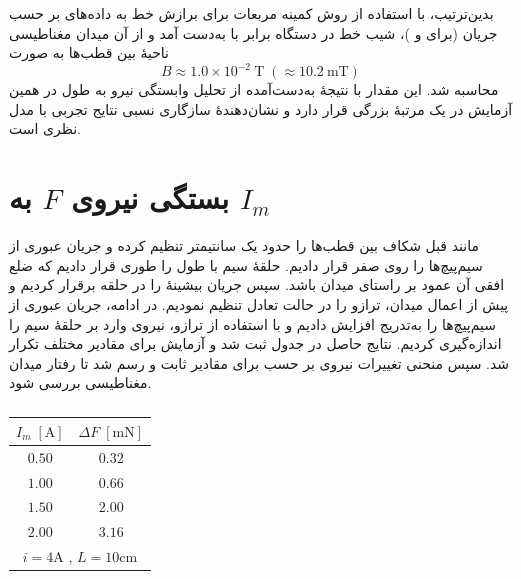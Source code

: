 \documentclass[a4paper, 11pt]{article}
\begin{document}
بدین‌ترتیب، با استفاده از روش کمینه مربعات برای برازش خط به داده‌های  بر حسب جریان  (برای  و )، شیب خط در دستگاه  برابر با  به‌دست آمد و از آن میدان مغناطیسی ناحیهٔ بین قطب‌ها به صورت
\begin{equation}
B \approx 1.0\times 10^{-2}~\mathrm{T} \;(\approx 10.2~\mathrm{mT})
\end{equation}
محاسبه شد. این مقدار با نتیجهٔ به‌دست‌آمده از تحلیل وابستگی نیرو به طول  در همین آزمایش در یک مرتبهٔ بزرگی قرار دارد و نشان‌دهندهٔ سازگاری نسبی نتایج تجربی با مدل نظری است.


\section{بستگی نیروی $F$ به $I_m$}

مانند قبل شکاف بین قطب‌ها را حدود یک سانتیمتر تنظیم کرده و جریان عبوری از سیم‌پیچ‌ها  را روی صفر قرار دادیم. حلقهٔ سیم با طول  را طوری قرار دادیم که ضلع افقی آن عمود بر راستای میدان باشد. سپس جریان بیشینهٔ  را در حلقه برقرار کردیم و پیش از اعمال میدان، ترازو را در حالت تعادل تنظیم نمودیم. در ادامه، جریان عبوری از سیم‌پیچ‌ها  را به‌تدریج افزایش دادیم و با استفاده از ترازو، نیروی وارد بر حلقهٔ سیم را اندازه‌گیری کردیم. نتایج حاصل در جدول ثبت شد و آزمایش برای مقادیر مختلف  تکرار شد. سپس منحنی تغییرات نیروی  بر حسب  برای مقادیر ثابت  و  رسم شد تا رفتار میدان مغناطیسی بررسی شود.

\begin{table}[h!]
\caption{}
\label{tab3}
\centering
\begin{tabular}{cc}
\hline
$I_m \;[\mathrm{A}]$ & $\Delta F \;[\mathrm{mN}]$ \\
\hline
$0.50$ & $0.32$ \\
$1.00$ & $0.66$ \\
$1.50$ & $2.00$ \\
$2.00$ & $3.16$ \\
\hline
\multicolumn{2}{c}{$i = 4\mathrm{A}$ , $L = 10\mathrm{cm}$}
\end{tabular}
\end{table}
\end{document}
